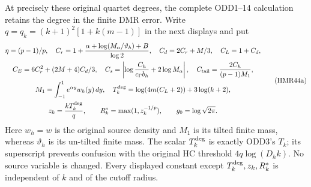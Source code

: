 At precisely these original quartet degrees, the complete
ODD1--14 calculation retains the degree in the finite DMR error.
Write $q=q_k=(k+1)^2[1+k(m-1)]$ in the next displays and put
\[
\begin{gathered}
 \eta=(p-1)/p,\quad
 C_r=1+\frac{\alpha+\log(M_\alpha/\vartheta_h)+B}{\log2},\quad
 C_d=2C_r+M/3,\quad C_L=1+C_d,\\
 C_E=6C_r^2+(2M+4)C_d/3,\quad
 C_s=\left|\log\frac{C_h}{c_\Gamma b_h}+2\log M_\alpha\right|,
 \quad C_{\rm tail}=\frac{2C_h}{(p-1)M_1},\\
 M_1=\int_{-1}^1e^{\alpha y}w_h(y)\,dy,\quad
 T_k^{\rm deg}=\log(4m(C_L+2))+3\log(k+2),\\
 z_k=\frac{kT_k^{\rm deg}}q,\qquad
 R_k^*=\max(1,z_k^{-1/p}),\qquad
 g_0=\log\sqrt{2\pi}.
\end{gathered}\tag{HMR44a}
\]
Here $w_h=w$ is the original source density and $M_1$ is its
tilted finite mass, whereas $\vartheta_h$ is its un-tilted
finite mass. The scalar $T_k^{\rm deg}$ is exactly ODD3's
$T_k$; its superscript prevents confusion with the original
HC threshold $4q\log(D_hk)$. No source variable is changed.
Every displayed constant except $T_k^{\rm deg},z_k,R_k^*$
is independent of $k$ and of the cutoff radius.


